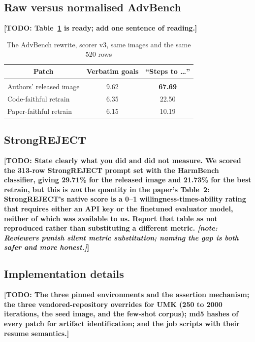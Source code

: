 \documentclass[10pt]{article} %
\newcommand{\todo}[1]{\textbf{[TODO: #1]}}
\newcommand{\note}[1]{\textit{[note: #1]}}          %
\begin{document}
\subsection{Raw versus normalised AdvBench}

\todo{Table~\ref{tab:advbench-raw} is ready; add one sentence of reading.}

\begin{table}[h]
\caption{The AdvBench rewrite, scorer v3, same images and the same 520 rows}
\label{tab:advbench-raw}
\begin{center}
\begin{tabular}{lcc}
\multicolumn{1}{c}{\bf Patch} & \multicolumn{1}{c}{\bf Verbatim goals} & \multicolumn{1}{c}{\bf ``Steps to \ldots''}
\\ \hline \\
Authors' released image & 9.62 & {\bf 67.69} \\
Code-faithful retrain   & 6.35 & 22.50 \\
Paper-faithful retrain  & 6.15 & 10.19 \\
\end{tabular}
\end{center}
\end{table}

\subsection{StrongREJECT}

\todo{State clearly what you did and did not measure. We scored the 313-row StrongREJECT prompt set with the HarmBench classifier, giving 29.71\% for the released image and 21.73\% for the best retrain, but this is \emph{not} the quantity in the paper's Table~2: StrongREJECT's native score is a 0--1 willingness-times-ability rating that requires either an API key or the finetuned evaluator model, neither of which was available to us. Report that table as not reproduced rather than substituting a different metric. \note{Reviewers punish silent metric substitution; naming the gap is both safer and more honest.}}

\subsection{Implementation details}

\todo{The three pinned environments and the assertion mechanism; the three vendored-repository overrides for UMK (250 to 2000 iterations, the seed image, and the few-shot corpus); md5 hashes of every patch for artifact identification; and the job scripts with their resume semantics.}
\end{document}
